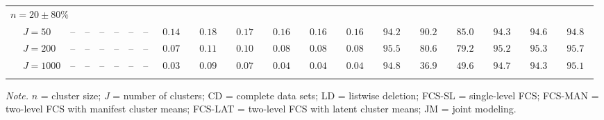 \begin{sidewaystable}
\begin{threeparttable}
\begin{tabular}{llcccccccccccccccccc}
\multicolumn{4}{l}{$n=20\pm80\%$ } \\  & \nopagebreak $\;J=50$  & \phantom{00}--\phantom{00} & \phantom{00}--\phantom{00} & \phantom{00}--\phantom{00} & \phantom{00}--\phantom{00} & \phantom{00}--\phantom{00} & \phantom{00}--\phantom{00} & $\phantom{0}0.14\phantom{0}$ & $\phantom{0}0.18\phantom{0}$ & $\phantom{0}0.17\phantom{0}$ & $\phantom{0}0.16\phantom{0}$ & $\phantom{0}0.16\phantom{0}$ & $\phantom{0}0.16\phantom{0}$ & $\phantom{0}94.2\phantom{0}$ & $\phantom{0}90.2\phantom{0}$ & $\phantom{0}85.0\phantom{0}$ & $\phantom{0}94.3\phantom{0}$ & $\phantom{0}94.6\phantom{0}$ & $\phantom{0}94.8\phantom{0}$ \\
 & \nopagebreak $\;J=200$  & \phantom{00}--\phantom{00} & \phantom{00}--\phantom{00} & \phantom{00}--\phantom{00} & \phantom{00}--\phantom{00} & \phantom{00}--\phantom{00} & \phantom{00}--\phantom{00} & $\phantom{0}0.07\phantom{0}$ & $\phantom{0}0.11\phantom{0}$ & $\phantom{0}0.10\phantom{0}$ & $\phantom{0}0.08\phantom{0}$ & $\phantom{0}0.08\phantom{0}$ & $\phantom{0}0.08\phantom{0}$ & $\phantom{0}95.5\phantom{0}$ & $\phantom{0}80.6\phantom{0}$ & $\phantom{0}79.2\phantom{0}$ & $\phantom{0}95.2\phantom{0}$ & $\phantom{0}95.3\phantom{0}$ & $\phantom{0}95.7\phantom{0}$ \\
 & \nopagebreak $\;J=1000$  & \phantom{00}--\phantom{00} & \phantom{00}--\phantom{00} & \phantom{00}--\phantom{00} & \phantom{00}--\phantom{00} & \phantom{00}--\phantom{00} & \phantom{00}--\phantom{00} & $\phantom{0}0.03\phantom{0}$ & $\phantom{0}0.09\phantom{0}$ & $\phantom{0}0.07\phantom{0}$ & $\phantom{0}0.04\phantom{0}$ & $\phantom{0}0.04\phantom{0}$ & $\phantom{0}0.04\phantom{0}$ & $\phantom{0}94.8\phantom{0}$ & $\phantom{0}36.9\phantom{0}$ & $\phantom{0}49.6\phantom{0}$ & $\phantom{0}94.7\phantom{0}$ & $\phantom{0}94.3\phantom{0}$ & $\phantom{0}95.1\phantom{0}$ \\
[0.5ex]\hline\\[-1.6ex] 
\end{tabular}
\begin{tablenotes}{\footnotesize \textit{Note.} $n$ = cluster size; $J$ = number of clusters; CD = complete data sets; LD = listwise deletion; FCS-SL = single-level FCS; FCS-MAN = two-level FCS with manifest cluster means; FCS-LAT = two-level FCS with latent cluster means; JM = joint modeling.}\end{tablenotes}
\end{threeparttable}
\end{sidewaystable}
